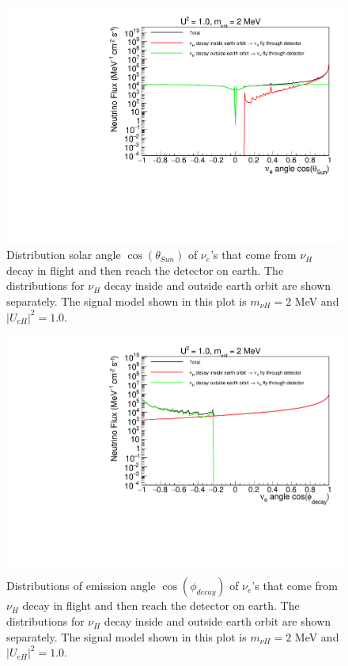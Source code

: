 \documentclass[%
 reprint,
 amsmath,amssymb,
 aps,
 prd,
floatfix,
twocolumn,
]{revtex4-1}
\begin{document}
\begin{figure}[!htbp]
\includegraphics[width=0.99\columnwidth]{../plots/DecayInFlightNuLCosthetaSun_U1.0_M2.0_InsideOutside_linXlogY.pdf}
\caption{Distribution solar angle $\cos(\theta_{Sun})$ of $\nu_e$'s that come from $\nu_H$ decay in flight and then reach the detector on earth. The distributions for $\nu_H$ decay inside and outside earth orbit are shown separately. The signal model shown in this plot is $m_{\nu H} = 2$ MeV and $|U_{eH}|^2 = 1.0$.}
\label{fig:DecayInFlightTheta_U1.0_M2} 
\end{figure}


\begin{figure}[!htbp]
\includegraphics[width=0.99\columnwidth]{../plots/DecayInFlightNuLCosphiSun_U1.0_M2.0_InsideOutside_linXlogY.pdf}
\caption{Distributions of emission angle $\cos(\phi_{decay})$ of $\nu_e$'s that come from $\nu_H$ decay in flight and then reach the detector on earth. The distributions for $\nu_H$ decay inside and outside earth orbit are shown separately. The signal model shown in this plot is $m_{\nu H} = 2$ MeV and $|U_{eH}|^2 = 1.0$.}
\label{fig:DecayInFlightPhi_U1.0_M2} 
\end{figure}
\end{document}
